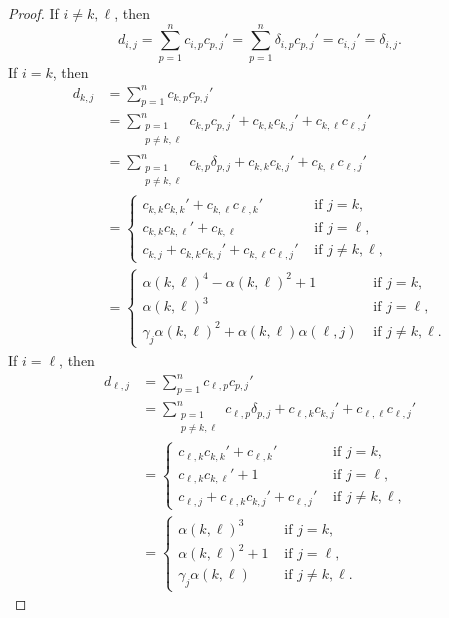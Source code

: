 \documentclass[12pt]{amsart}
\theoremstyle{definition}
\numberwithin{equation}{section}
\begin{document}
\begin{proof}
If $i\neq k, \ell$, then 
$$    d_{i,j} =\sum_{p=1}^{n} c_{i,p}c_{p,j}'   =\sum_{p=1}^{n} \delta_{i,p}c_{p,j}' =c_{i,j}' = \delta_{i,j}.$$ 
If $i=k$, then 
$$
\begin{aligned}
  d_{k,j}  &=\sum_{p=1}^{n} c_{k,p}c_{p,j}' \\
      &=\sum_{\substack{p=1\\p\neq k,\ell}}^{n}c_{k,p}c_{p,j}' + c_{k,k}c_{k,j}' + c_{k,\ell}c_{\ell,j}'\\
      &=\sum_{\substack{p=1\\p\neq k,\ell}}^{n}c_{k,p}\delta_{p,j} + c_{k,k}c_{k,j}' + c_{k,\ell}c_{\ell,j}'\\
      &=\begin{cases}
          c_{k,k}c_{k,k}' + c_{k,\ell}c_{\ell,k}' &\text { if } j=k,\\
          c_{k,k}c_{k,\ell}' + c_{k,\ell} &\text { if } j=\ell, \\
          c_{k,j}+c_{k,k}c_{k,j}'+c_{k,\ell}c_{\ell,j}' &\text { if } j\neq k, \ell,
      \end{cases} \\
      &=\begin{cases}
           \alpha(k,\ell)^4-\alpha(k,\ell)^2+1 & \text{ if } j=k,\\
      \alpha(k,\ell)^3 & \text{ if }  j=\ell,\\
	\gamma_j\alpha(k,\ell)^2+\alpha(k,\ell)\alpha(\ell,j)  & \text{ if }  j\neq k ,\ell.
\end{cases}
\end{aligned}
$$
If $i=\ell$, then 
$$
\begin{aligned}
  d_{\ell,j}  &=\sum_{p=1}^{n} c_{\ell,p}c_{p,j}' \\
      &=\sum_{\substack{p=1\\p\neq k,\ell}}^{n}c_{\ell,p}\delta_{p,j} + c_{\ell,k}c_{k,j}' + c_{\ell,\ell}c_{\ell,j}'\\
      &=\begin{cases}
         c_{\ell,k}c_{k,k}' + c_{\ell,k}'  &\text { if } j=k,\\
	c_{\ell,k}c_{k,\ell}'+ 1  &\text { if } j=\ell, \\
         c_{\ell,j} + c_{\ell,k}c_{k,j}' +c_{\ell,j}' &\text { if } j\neq k, \ell,
      \end{cases} \\
      &=\begin{cases}
        \alpha(k,\ell)^3  &\text { if } j=k,\\
		\alpha(k,\ell)^2 + 1  &\text { if } j=\ell, \\
		\gamma_j\alpha(k,\ell)	 &\text { if } j\neq k, \ell.
      \end{cases}
      \end{aligned}
$$
\end{proof}
\end{document}
